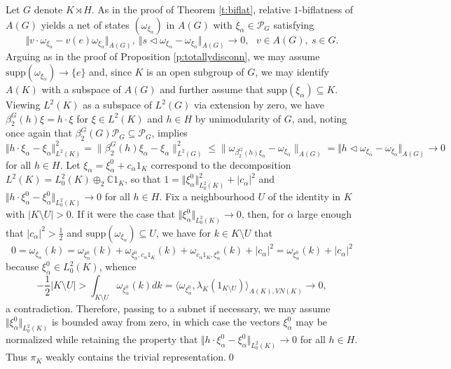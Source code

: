 \documentclass[preprint,12pt]{elsarticle}
\providecommand{\norm}[1]{\lVert#1\rVert}
\begin{document}
\begin{pf}
Let $G$ denote $K\rtimes H$. As in the proof of Theorem \ref{t:biflat},
relative $1$-biflatness of $A(G)$ yields a net of states
$(\omega_{\xi_{\alpha}})$ in $A(G)$ with $\xi_{\alpha}\in\mathcal{P}_{G}$
satisfying\[
\Vert v\cdot\omega_{\xi_{\alpha}}-v(e)\omega_{\xi_{\alpha}}\Vert _{A(G)}, \ \Vert s\vartriangleleft\omega_{\xi_{\alpha}}-\omega_{\xi_{\alpha}}\Vert _{A(G)}\rightarrow0, \ \ \ v\in A(G), \ s\in G.\]
Arguing as in the proof of Proposition \ref{p:totallydisconn}, we may assume $\mbox{supp}(\omega_{\xi_{\alpha}})\rightarrow\{ e\} $
and, since $K$ is an open subgroup of $G$, we may identify $A(K)$
with a subspace of $A(G)$ and further assume that $\mbox{supp}(\xi_{\alpha})\subseteq K$.
Viewing $L^2(K)$ as a subspace of
$L^{2}(G)$ via extension by zero, we have $\beta_{2}^{G}(h)\xi=h\cdot\xi$ for $\xi\in L^2(K)$ and $h\in H$
by unimodularity of $G$, and, noting once again that $\beta_{2}^{G}(G)\mathcal{P}_{G}\subseteq\mathcal{P}_{G}$,
\cite[Lemma 2.10]{H} implies\[
\Vert h\cdot\xi_{\alpha}-\xi_{\alpha}\Vert _{L^2(K)}^{2}=\norm{ \beta_{2}^{G}(h)\xi_{\alpha}-\xi_{\alpha}} _{L^{2}(G)}^{2}\leq\norm{ \omega_{\beta_{2}^{G}(h)\xi_{\alpha}}-\omega_{\xi_{\alpha}}} _{A(G)}=\Vert h\vartriangleleft\omega_{\xi_{\alpha}}-\omega_{\xi_{\alpha}}\Vert _{A(G)}\rightarrow0\]
for all $h\in H$. Let $\xi_{\alpha}=\xi_{\alpha}^{0}+c_{\alpha}1_{K}$
correspond to the decomposition $L^2(K)=L_0^2(K)\oplus_{2}\mathbb{C}1_{K}$,
so that $1=\Vert \xi_{\alpha}^{0}\Vert _{L_0^{2}(K)}^{2}+|c_{\alpha}|^{2}$
and $\Vert h\cdot\xi_{\alpha}^{0}-\xi_{\alpha}^{0}\Vert _{L_0^{2}(K)}\rightarrow0$ for all $h\in H$.
Fix a neighbourhood $U$ of the identity in $K$ with $|K\setminus U|>0$.
If it were the case that $\Vert \xi_{\alpha}^{0}\Vert _{L_0^{2}(K)}\rightarrow0$,
then, for $\alpha$ large enough that $|c_{\alpha}|^{2}>\frac{1}{2}$
and $\mbox{supp}(\omega_{\xi_{\alpha}})\subseteq U$, we
have for $k\in K\setminus U$ that \[
0=\omega_{\xi_{\alpha}}(k)=\omega_{\xi_{\alpha}^{0}}(k)+\omega_{\xi_{\alpha}^{0},c_{\alpha}1_{K}}(k)+\omega_{c_{\alpha}1_{K},\xi_{\alpha}^{0}}(k)+|c_{\alpha}|^{2}=\omega_{\xi_{\alpha}^{0}}(k)+|c_{\alpha}|^{2}\]
because $\xi_{\alpha}^{0}\in L_0^2(K)$, whence\[
-\frac{1}{2}|K\setminus U|>\int_{K\setminus U}\omega_{\xi_{\alpha}^{0}}(k)dk=\langle \omega_{\xi_{\alpha}^{0}},\lambda_{K}(1_{K\setminus U})\rangle _{A(K),VN(K)}\rightarrow0,\]
a contradiction. Therefore, passing to a subnet if necessary, we may
assume $\Vert \xi_{\alpha}^{0}\Vert _{L_0^{2}(K)}$ is bounded away
from zero, in which case the vectors $\xi_{\alpha}^{0}$ may be normalized
while retaining the property that $\Vert h\cdot\xi^0_{\alpha}-\xi^0_{\alpha}\Vert _{L_0^{2}(K)}\rightarrow0$
for all $h\in H$. Thus $\pi_{K}$ weakly contains the trivial representation.\qed\end{pf}
\end{document}

